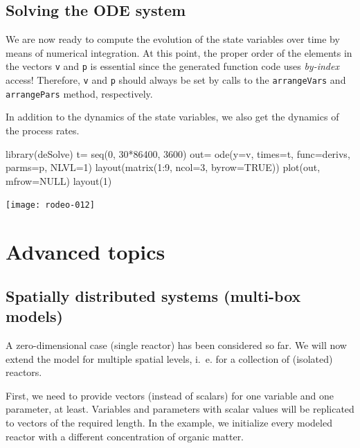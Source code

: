 \documentclass[times,onecolumn]{article}
\begin{document}
\subsection{Solving the ODE system}

We are now ready to compute the evolution of the state variables over time by means of numerical integration. At this point, the proper order of the elements in the vectors \verb|v| and \verb|p| is essential since the generated function code uses \emph{by-index} access! Therefore, \verb|v| and \verb|p| should always be set by calls to the \verb|arrangeVars| and \verb|arrangePars| method, respectively.

In addition to the dynamics of the state variables, we also get the dynamics of the process rates.

\begin{Schunk}
\begin{Sinput}
 library(deSolve)
 t= seq(0, 30*86400, 3600)
 out= ode(y=v, times=t, func=derivs, parms=p, NLVL=1)
 layout(matrix(1:9, ncol=3, byrow=TRUE))
 plot(out, mfrow=NULL)
 layout(1)
\end{Sinput}
\end{Schunk}
\texttt{[image: rodeo-012]}


\clearpage
\section{Advanced topics} \label{sec:advanced}


\subsection{Spatially distributed systems (multi-box models)} \label{sec:advanced:multibox}

A zero-dimensional case (single reactor) has been considered so far. We will now extend the model for multiple spatial levels, i.~e. for a collection of (isolated) reactors.

First, we need to provide vectors (instead of scalars) for one variable and one parameter, at least. Variables and parameters with scalar values will be replicated to vectors of the required length. In the example, we initialize every modeled reactor with a different concentration of organic matter.
\end{document}
